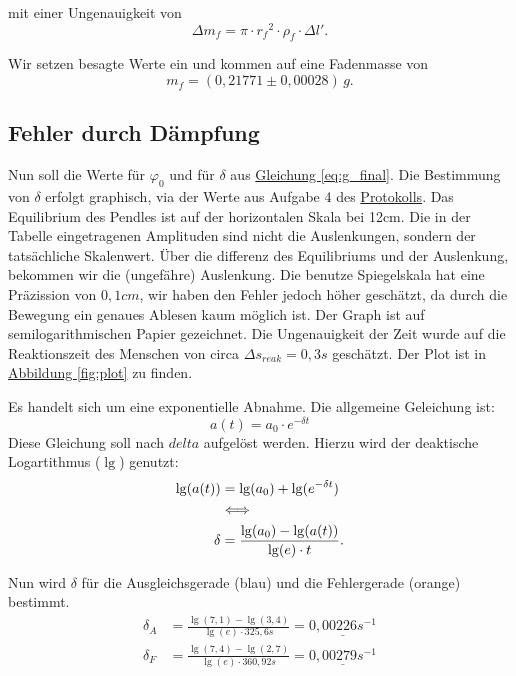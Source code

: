 mit einer Ungenauigkeit von
\begin{equation}
    \Delta m_f = \pi \cdot {r_f}^2 \cdot \rho_f \cdot \Delta l'.
\end{equation}

Wir setzen besagte Werte ein und kommen auf eine Fadenmasse von
\begin{equation}
    \boxed{
        m_f = (0,21771 \pm 0,00028) \, g.
    }
\end{equation}

\subsection{Fehler durch Dämpfung}
Nun soll die Werte für $\varphi_0$ und für $\delta$ aus \hyperref[eq:g_final]{Gleichung \ref*{eq:g_final}}. Die Bestimmung von $\delta$ erfolgt graphisch, via der Werte aus Aufgabe 4 des \hyperref[Protokoll]{Protokolls}. 
Das Equilibrium des Pendles ist auf der horizontalen Skala bei 12cm. Die in der Tabelle eingetragenen Amplituden sind nicht die Auslenkungen, sondern der tatsächliche Skalenwert. Über die differenz des Equilibriums und der Auslenkung, bekommen wir die (ungefähre) Auslenkung.
Die benutze Spiegelskala hat eine Präzission von $0,1cm$, wir haben den Fehler jedoch höher geschätzt, da durch die Bewegung ein genaues Ablesen kaum möglich ist. Der Graph ist auf semilogarithmischen Papier gezeichnet.
Die Ungenauigkeit der Zeit wurde auf die Reaktionszeit des Menschen von circa $\Delta s_{reak} = 0,3s$ geschätzt. Der Plot ist in \hyperref[fig:plot]{Abbildung \ref*{fig:plot}} zu finden.

Es handelt sich um eine exponentielle Abnahme. Die allgemeine Geleichung ist:
\begin{equation}
    a(t) = a_0 \cdot e^{-\delta t}
\end{equation}
Diese Gleichung soll nach $delta$ aufgelöst werden. Hierzu wird der deaktische Logartithmus ($\lg$) genutzt:
\begin{align}
    \lg(a(t)) &= \lg(a_0) + \lg(e^{-\delta t}) \\ 
    \notag &\Longleftrightarrow \\
    \delta &= \frac{\lg(a_0) - \lg (a(t))}{\lg(e) \cdot t}.
\end{align}

Nun wird $\delta$ für die Ausgleichsgerade (blau) und die Fehlergerade (orange) bestimmt.
\begin{align}
    \delta_A &= \frac{\lg(7,1) - \lg(3,4)}{\lg(e) \cdot 325,6s} = \underline{0,00226 s^{-1}}\\
    \delta_F &= \frac{\lg(7,4) - \lg(2,7)}{\lg(e) \cdot 360,92s} = \underline{0,00279 s^{-1}}
\end{align}

